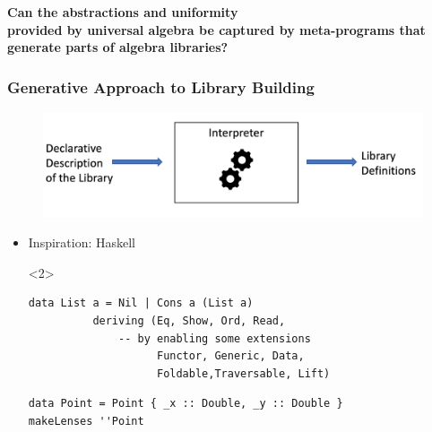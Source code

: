 \documentclass[t,10pt,numbers,fleqn,usenames,xcolor=dvipsnames]{beamer}
\begin{document}
\begin{frame}%
\vfill 
\begin{center}
\Large{\textbf{
Can the abstractions and uniformity \\
provided by universal algebra be captured by 
meta-programs 
that generate parts of algebra libraries? }}
\end{center}
\vfill 
\end{frame}


\begin{frame}[fragile]
\frametitle{Generative Approach to Library Building}
\begin{figure}
    \includegraphics[scale=0.2]{figures/interpreter_small.png}
\end{figure}
\pause
\begin{itemize}
    \item Inspiration: Haskell  
\begin{onlyenv}<2>
    \begin{verbatim}
data List a = Nil | Cons a (List a) 
          deriving (Eq, Show, Ord, Read,
              -- by enabling some extensions 
                    Functor, Generic, Data,         
                    Foldable,Traversable, Lift)
    \end{verbatim}
    \vspace{0.5cm}
    \begin{verbatim}
data Point = Point { _x :: Double, _y :: Double }
makeLenses ''Point  
     \end{verbatim}
\end{onlyenv}     
\end{itemize}
\end{frame}
\end{document}

